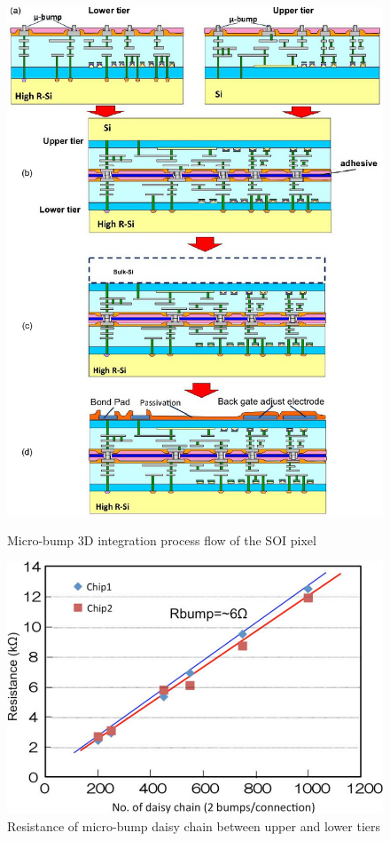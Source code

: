\begin{figure}
 \begin{minipage}[t]{0.35\textwidth}
\centering     \includegraphics*[width=\textwidth,keepaspectratio]{VertexDetector/SOI/microBump3DIntegration}
\caption{Micro-bump 3D integration process flow of the SOI pixel}
\label{fig:VertexDetector:SOI:microbump3D}
 \end{minipage}
 \hfill
 \begin{minipage}[t]{0.64\textwidth}
 \centering
    \includegraphics*[width=\textwidth,keepaspectratio]{VertexDetector/SOI/resistanceOfDaisyChain}
	\caption{Resistance of micro-bump daisy chain between upper and lower tiers}
	\label{fig:VertexDetector:SOI:resistanceOfDaisyChain}
 \end{minipage}
 \end{figure}

